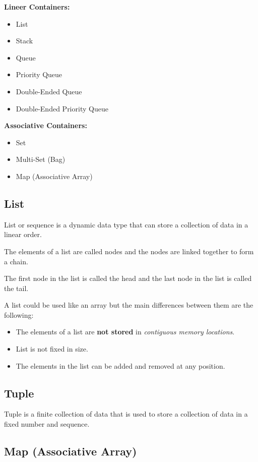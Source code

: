 \documentclass{book}
\begin{document}
\noindent\textbf{Lineer Containers:}
\begin{itemize}
\item List
\item Stack
\item Queue
\item Priority Queue
\item Double-Ended Queue
\item Double-Ended Priority Queue
\end{itemize}
\textbf{Associative Containers:}
\begin{itemize}
\item Set
\item Multi-Set (Bag)
\item Map (Associative Array)
\end{itemize}

\subsection{List}

List or sequence is a dynamic data type that can store a collection of data in a linear order.

\noindent The elements of a list are called nodes and the nodes are linked together to form a chain.

\noindent The first node in the list is called the head and the last node in the list is called the tail.

\noindent A list could be used like an array but the main differences between them are the following:
\begin{itemize}
\item The elements of a list are \textbf{not stored} in \textit{contiguous memory locations}.
\item List is not fixed in size.
\item The elements in the list can be added and removed at any position.
\end{itemize}

\subsection{Tuple}

Tuple is a finite collection of data that is used to store a collection of data in a fixed number and sequence.

\subsection{Map (Associative Array)}
\end{document}
